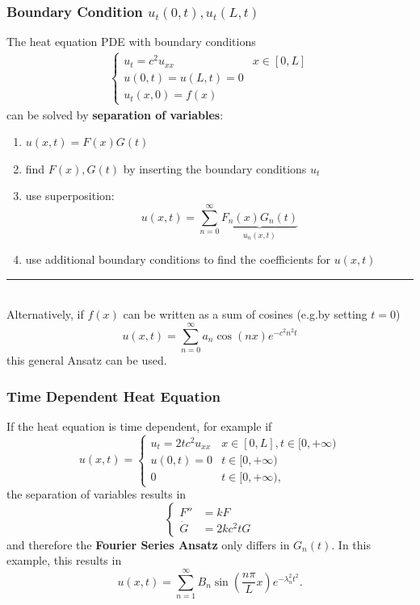 \subsubsection{Boundary Condition \texorpdfstring{$u_{t}(0,t),u_{t}(L,t)$}{ut (0,t), ut (L,t)}}
The heat equation PDE with boundary conditions
\begin{align*}
    \begin{cases}
        u_t=c^2u_{xx} & x\in[0,L] \\
        u(0,t)=u(L,t)=0           \\
        u_t(x,0)=f(x)
    \end{cases}
\end{align*}
can be solved by \textbf{separation of variables}:
\begin{enumerate}
    \item $u(x,t)=F(x)G(t)$
    \item find $F(x),G(t)$ by inserting the boundary conditions $u_t$
    \item use superposition:
          \begin{equation*}
              u(x,t)=\sum_{n=0}^{\infty} \underbrace{F_n(x)G_n(t)}_{u_n(x,t)}
          \end{equation*}
    \item use additional boundary conditions to find the coefficients for $u(x,t)$
\end{enumerate}
{\color{gray}\hrule}\, \\
Alternatively, if $f(x)$ can be written as a sum of cosines (e.g.\@ by setting $t = 0$)
\begin{equation*}
    u(x,t)=\sum_{n=0}^{\infty}a_n\cos(nx)e^{-c^2n^2t}
\end{equation*}
this general Ansatz can be used.
\subsubsection{Time Dependent Heat Equation}
If the heat equation is time dependent, for example if
\begin{equation*}
    u(x,t)=
    \begin{cases}u_t=2tc^2u_{xx} & x\in[0,L],t\in[0,+\infty) \\%
             u(0,t)=0        & t\in[0,+\infty)           \\%
             0               & t\in[0,+\infty),          %
    \end{cases}
\end{equation*}
the separation of variables results in
\begin{equation*}
    \begin{cases}
        F''     & =kF      \\
        \dot{G} & =2kc^2tG
    \end{cases}
\end{equation*}
and therefore the \textbf{Fourier Series Ansatz} only differs in $G_n(t)$.
In this example, this results in
\begin{equation*}
    u(x,t) =\sum_{n=1}^\infty B_n\sin(\frac{n\pi}Lx)e^{-\lambda_n^2t^2}.
\end{equation*}

